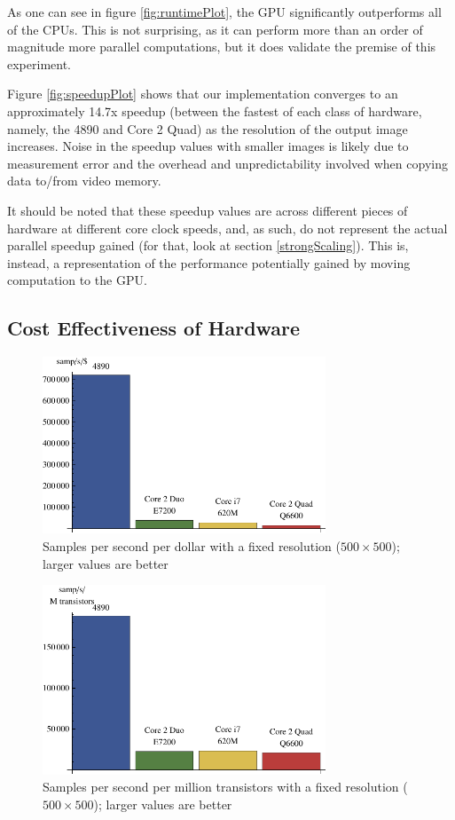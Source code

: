 \documentclass{acmsiggraph}
\begin{document}
As one can see in figure \ref{fig:runtimePlot}, the GPU significantly outperforms all of the CPUs. This is not surprising, as it can perform more than an order of magnitude more parallel computations, but it does validate the premise of this experiment.

Figure \ref{fig:speedupPlot} shows that our implementation converges to an approximately 14.7x speedup (between the fastest of each class of hardware, namely, the 4890 and Core 2 Quad) as the resolution of the output image increases. Noise in the speedup values with smaller images is likely due to measurement error and the overhead and unpredictability involved when copying data to/from video memory.

It should be noted that these speedup values are across different pieces of hardware at different core clock speeds, and, as such, do not represent the actual parallel speedup gained (for that, look at section \ref{strongScaling}). This is, instead, a representation of the performance potentially gained by moving computation to the GPU.

\subsection{Cost Effectiveness of Hardware}

\begin{figure}
    \includegraphics[width=84.5mm]{dollarPlot.pdf}
    \caption{Samples per second per dollar with a fixed resolution ($500\times500$); larger values are better}
    \label{fig:costEffectiveness}
\end{figure}

\begin{figure}
    \includegraphics[width=84.5mm]{transistorPlot.pdf}
    \caption{Samples per second per million transistors with a fixed resolution ($500\times500$); larger values are better}
    \label{fig:transistorPlot}
\end{figure}
\end{document}
